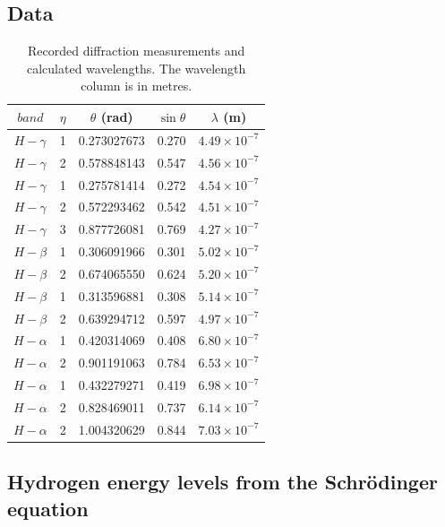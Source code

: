 \documentclass[12pt,a4paper]{article}
\begin{document}
\subsection{Data}
\begin{table}[!ht]
    \centering
    \caption{Recorded diffraction measurements and calculated
    wavelengths. The wavelength column is in metres.}
    \label{tab:raw-data}
    \begin{tabular}{ccccc}
        \toprule
        $band$ & $\eta$ & $\theta$ (rad) & $\sin\theta$ &
        $\lambda$ (m) \\
        \midrule
        \color{violet}$H-\gamma$ & 1 & 0.273027673 & 0.270 & $4.49\times10^{-7}$ \\
        \color{violet}$H-\gamma$ & 2 & 0.578848143 & 0.547 & $4.56\times10^{-7}$ \\
        \color{violet}$H-\gamma$ & 1 & 0.275781414 & 0.272 & $4.54\times10^{-7}$ \\
        \color{violet}$H-\gamma$ & 2 & 0.572293462 & 0.542 & $4.51\times10^{-7}$ \\
        \color{violet}$H-\gamma$ & 3 & 0.877726081 & 0.769 & $4.27\times10^{-7}$ \\
        \color{teal}$H-\beta$ & 1 & 0.306091966 & 0.301 & $5.02\times10^{-7}$ \\
        \color{teal}$H-\beta$ & 2 & 0.674065550 & 0.624 & $5.20\times10^{-7}$ \\
        \color{teal}$H-\beta$ & 1 & 0.313596881 & 0.308 & $5.14\times10^{-7}$ \\
        \color{teal}$H-\beta$ & 2 & 0.639294712 & 0.597 & $4.97\times10^{-7}$ \\
        \color{red}$H-\alpha$ & 1 & 0.420314069 & 0.408 & $6.80\times10^{-7}$ \\
        \color{red}$H-\alpha$ & 2 & 0.901191063 & 0.784 & $6.53\times10^{-7}$ \\
        \color{red}$H-\alpha$ & 1 & 0.432279271 & 0.419 & $6.98\times10^{-7}$ \\
        \color{red}$H-\alpha$ & 2 & 0.828469011 & 0.737 & $6.14\times10^{-7}$ \\
        \color{red}$H-\alpha$ & 2 & 1.004320629 & 0.844 & $7.03\times10^{-7}$ \\
        \bottomrule
    \end{tabular}
\end{table}

\subsection{Hydrogen energy levels from the Schr\"odinger equation}
\end{document}
